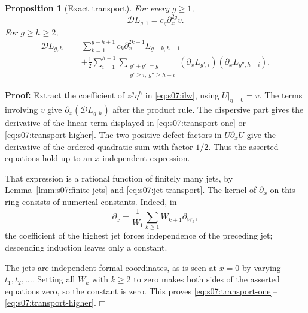 \documentclass[a4paper,10pt]{article}
\numberwithin{equation}{section}
\theoremstyle{paperplain}
\newtheorem{prp}[thm]{Proposition}
\theoremstyle{paperremark}
\theoremstyle{paperplain}
\newenvironment{prf}{\noindent \textbf{Proof: }}{\hfill $\mdlgwhtsquare$\par\addvspace{0.5\baselineskip}}
\begin{document}
\begin{prp}[Exact transport]\label{prp:s07:transport}
For every $g\geq1$,
\begin{equation}\label{eq:s07:transport-one}
 \mathscr DL_{g,1}=c_g\partial_x^{2g}v.
\end{equation}
For $g\geq h\geq2$,
\begin{equation}\label{eq:s07:transport-higher}
 \begin{aligned}
 \mathscr DL_{g,h}
 ={}&\sum_{k=1}^{g-h+1}c_k\partial_x^{2k+1}L_{g-k,h-1}\\
 &+\frac12\sum_{i=1}^{h-1}
   \sum_{\substack{g'+g''=g\\g'\geq i,\ g''\geq h-i}}
       (\partial_xL_{g',i})(\partial_xL_{g'',h-i}).
 \end{aligned}
\end{equation}
\end{prp}
\begin{prf}
Extract the coefficient of $z^g\eta^h$ in
\eqref{eq:s07:ilw}, using $U|_{\eta=0}=v$. The terms involving
$v$ give $\partial_x(\mathscr DL_{g,h})$ after the product rule.
The dispersive part gives the derivative of the linear term displayed
in \eqref{eq:s07:transport-one} or
\eqref{eq:s07:transport-higher}. The two positive-defect factors
in $U\partial_xU$ give the derivative of the ordered quadratic sum
with factor $1/2$. Thus the asserted equations hold up to an
$x$-independent expression.

That expression is a rational function of finitely many jets, by
Lemma~\ref{lmm:s07:finite-jets} and
\eqref{eq:s07:jet-transport}. The kernel of $\partial_x$ on this
ring consists of numerical constants. Indeed, in
\[
 \partial_x=\frac1{W_1}\sum_{k\geq1}W_{k+1}\partial_{W_k},
\]
the coefficient of the highest jet forces independence of the
preceding jet; descending induction leaves only a constant.

The jets are independent formal coordinates, as is seen at $x=0$
by varying $t_1,t_2,\ldots$. Setting all $W_k$ with $k\geq2$ to
zero makes both sides of the asserted equations zero, so the
constant is zero. This proves
\eqref{eq:s07:transport-one}--\eqref{eq:s07:transport-higher}.
\end{prf}
\end{document}
